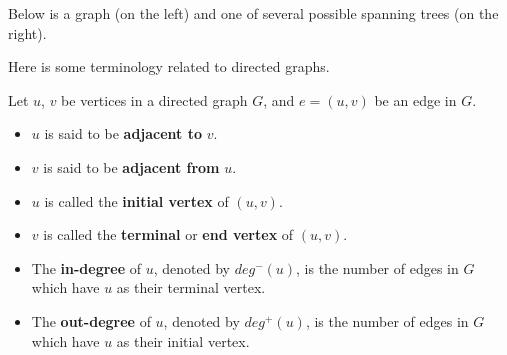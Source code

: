 \begin{exa}
Below is a graph (on the left) and one of several possible
spanning trees (on the right).
\begin{center}
\end{center}
\end{exa}



Here is some terminology related to directed graphs.

\begin{df}
Let $u$, $v$ be vertices in a directed graph $G$, and
$e=(u,v)$ be an edge in $G$.  
\begin{itemize}
\item $u$ is said to be {\bf adjacent to} $v$.
\item $v$ is said to be {\bf adjacent from} $u$.
\item $u$ is called the {\bf initial vertex} of $(u,v)$.
\item $v$ is called the {\bf terminal} or {\bf end vertex} of $(u,v)$.
\item
The {\bf in-degree} of $u$, denoted by $deg^{-}(u)$, 
is the number of edges in $G$ which have $u$ as their terminal vertex.
\item
The {\bf out-degree} of $u$, denoted by $deg^{+}(u)$, 
is the number of edges in $G$ which have $u$ as their initial vertex.
\end{itemize}
\end{df}

\newpage

